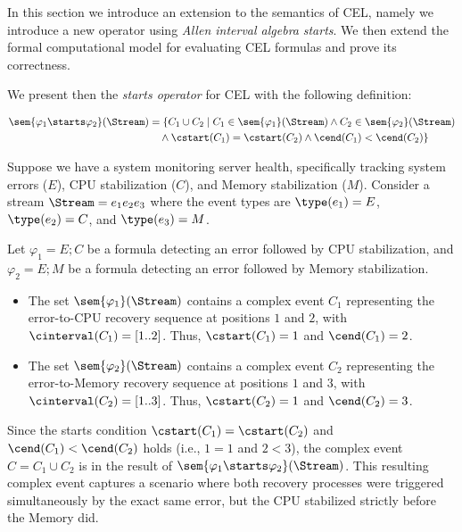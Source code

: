 In this section we introduce an extension to the semantics of CEL, namely we introduce a new operator using \textit{Allen interval algebra} \textit{starts}.
We then extend the formal computational model for evaluating CEL formulas and prove its correctness.

We present then the \emph{starts operator} for CEL with the following definition:


$$\begin{aligned} 	\sem{\varphi_1 \starts \varphi_2}(\Stream) 	&= \{C_1 \cup C_2 \mid C_1 \in \sem{\varphi_1}(\Stream)  	\land C_2 \in \sem{\varphi_2}(\Stream) \\ 	&\quad \land \cstart(C_1) = \cstart(C_2) \land \cend(C_1) < \cend(C_2)\} \end{aligned}$$

\begin{example} Suppose we have a system monitoring server health, specifically tracking system errors ($E$), CPU stabilization ($C$), and Memory stabilization ($M$). Consider a stream $\Stream = e_1 e_2 e_3$ where the event types are $\type(e_1) = E$, $\type(e_2) = C$, and $\type(e_3) = M$.

Let $\varphi_1 = E ; C$ be a formula detecting an error followed by CPU stabilization, and $\varphi_2 = E ; M$ be a formula detecting an error followed by Memory stabilization.
\begin{itemize}
	\item The set $\sem{\varphi_1}(\Stream)$ contains a complex event $C_1$ representing the error-to-CPU recovery sequence at positions $1$ and $2$, with $\cinterval(C_1) = [1..2]$. Thus, $\cstart(C_1) = 1$ and $\cend(C_1) = 2$.
	\item The set $\sem{\varphi_2}(\Stream)$ contains a complex event $C_2$ representing the error-to-Memory recovery sequence at positions $1$ and $3$, with $\cinterval(C_2) = [1..3]$. Thus, $\cstart(C_2) = 1$ and $\cend(C_2) = 3$.
\end{itemize}

Since the starts condition $\cstart(C_1) = \cstart(C_2)$ and $\cend(C_1) < \cend(C_2)$ holds (i.e., $1 = 1$ and $2 < 3$), the complex event $C = C_1 \cup C_2$ is in the result of $\sem{\varphi_1 \starts \varphi_2}(\Stream)$. This resulting complex event captures a scenario where both recovery processes were triggered simultaneously by the exact same error, but the CPU stabilized strictly before the Memory did.
\end{example}

